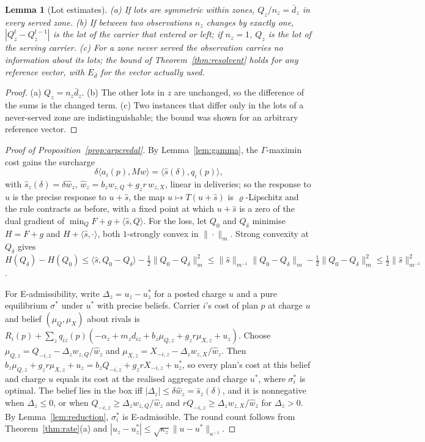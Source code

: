 \documentclass[preprint,11pt]{elsarticle}
\newtheorem{lemma}[theorem]{Lemma}
\theoremstyle{definition}
\theoremstyle{remark}
\newcommand{\ip}[2]{\langle #1,#2\rangle}
\begin{document}
\begin{lemma}[Lot estimates]\label{lem:lots}
(a) If lots are symmetric within zones, $Q_z/n_z=\bar d_z$ in every served zone. (b) If between two observations $n_z$ changes by exactly one, $|Q^t_z-Q^{t-1}_z|$ is the lot of the carrier that entered or left; if $n_z=1$, $Q_z$ is the lot of the serving carrier. (c) For a zone never served the observation carries no information about its lots; the bound of Theorem~\ref{thm:resolvent} holds for any reference vector, with $E_{\bar d}$ for the vector actually used.
\end{lemma}
\begin{proof}
(a) $Q_z=n_z\bar d_z$. (b) The other lots in $z$ are unchanged, so the difference of the sums is the changed term. (c) Two instances that differ only in the lots of a never-served zone are indistinguishable; the bound was shown for an arbitrary reference vector.
\end{proof}

\begin{proof}[Proof of Proposition~\ref{prop:arpcredal}]
By Lemma~\ref{lem:gamma}, the $\Gamma$-maximin cost gains the surcharge
\[\delta\ip{a_i(p)}{Mw}=\ip{\hat s(\delta)}{q_i(p)},\]
with $\hat s_z(\delta)=\delta\hat w_z$, $\hat w_z=b_zw_{z,Q}+g_zr\,w_{z,X}$, linear in deliveries; so the response to $u$ is the precise response to $u+\hat s$, the map $u\mapsto T(u+\hat s)$ is $\varrho$-Lipschitz and the rule contracts as before, with a fixed point at which $u+\hat s$ is a zero of the dual gradient of $\min_QF+g+\ip{\hat s}{Q}$. For the loss, let $Q_0$ and $Q_\delta$ minimise $H=F+g$ and $H+\ip{\hat s}\cdot$, both $1$-strongly convex in $\|\cdot\|_m$. Strong convexity at $Q_\delta$ gives $H(Q_\delta)-H(Q_0)\le\ip{\hat s}{Q_0-Q_\delta}-\tfrac12\|Q_0-Q_\delta\|_m^2\le\|\hat s\|_{m^{-1}}\|Q_0-Q_\delta\|_m-\tfrac12\|Q_0-Q_\delta\|_m^2\le\tfrac12\|\hat s\|_{m^{-1}}^2$.

For E-admissibility, write $\Delta_z=u_z-u^*_z$ for a posted charge $u$ and a pure equilibrium $\sigma^*$ under $u^*$ with precise beliefs. Carrier $i$'s cost of plan $p$ at charge $u$ and belief $(\mu_Q,\mu_X)$ about rivals is $R_i(p)+\sum_zq_{iz}(p)(-\alpha_z+m_zd_{iz}+b_z\mu_{Q,z}+g_zr\mu_{X,z}+u_z)$. Choose $\mu_{Q,z}=Q_{-i,z}-\Delta_zw_{z,Q}/\hat w_z$ and $\mu_{X,z}=X_{-i,z}-\Delta_zw_{z,X}/\hat w_z$. Then $b_z\mu_{Q,z}+g_zr\mu_{X,z}+u_z=b_zQ_{-i,z}+g_zrX_{-i,z}+u^*_z$, so every plan's cost at this belief and charge $u$ equals its cost at the realised aggregate and charge $u^*$, where $\sigma^*_i$ is optimal. The belief lies in the box iff $|\Delta_z|\le\delta\hat w_z=\hat s_z(\delta)$, and it is nonnegative when $\Delta_z\le0$, or when $Q_{-i,z}\ge\Delta_zw_{z,Q}/\hat w_z$ and $rQ_{-i,z}\ge\Delta_zw_{z,X}/\hat w_z$ for $\Delta_z>0$. By Lemma~\ref{lem:reduction}, $\sigma^*_i$ is E-admissible. The round count follows from Theorem~\ref{thm:rate}(a) and $|u_z-u^*_z|\le\sqrt{\kappa_z}\|u-u^*\|_{\kappa^{-1}}$.
\end{proof}
\end{document}
